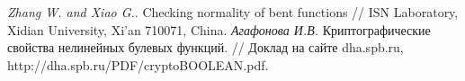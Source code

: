 \begin{thebibliography}{99}
 {\it Zhang W. and Xiao G.}. Checking normality of bent functions // ISN Laboratory, Xidian University, Xi’an 710071, China.
 {\it Агафонова И.В.} Криптографические свойства нелинейных булевых функций. // Доклад на сайте dha.spb.ru, http://dha.spb.ru/PDF/cryptoBOOLEAN.pdf.









\end{thebibliography}
